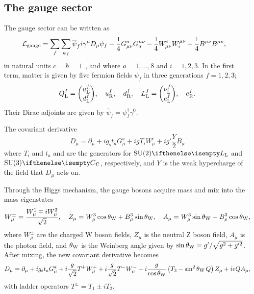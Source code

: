 \subsection{The gauge sector} \label{sec:gauge}
The gauge sector can be written as
\begin{align} \label{eq:gauge}
  \Lg{gauge} &= \sum_f \sum_{\psi_f} \overline{\psi}_f i\gamma^\mu D_\mu \psi_f %
              -\frac{1}{4} G^a_{\mu\nu}G_a^{\mu\nu}
              -\frac{1}{4} W^i_{\mu\nu}W_i^{\mu\nu}
              -\frac{1}{4} B^{\mu\nu}B^{\mu\nu},
\end{align}
in natural units $c=\hbar=1$~\cite{flavor_lecture_Isidori_UZH}, and where $a=1,...,8$ and $i=1,2,3$.
In the first term, matter is given by five fermion fields $\psi_f$ in three generations $f=1,2,3$;
\begin{equation} \label{eq:matter}
  \ff{Q}{L}^f = \db{\ff{u^f}{L}}{\ff{d^f}{L}},\quad
  \ff{u}{R}^f,\quad
  \ff{d}{R}^f,\quad
  \ff{L}{L}^f = \db{\ff{\nu^f}{L}}{\ff{e^f}{L}},\quad
  \ff{e}{R}^f.
\end{equation}
Their Dirac adjoints are given by $\overline{\psi}_f = \psi_f^\dagger\gamma^0$.



The covariant derivative
\begin{equation}
  D_\mu = \partial_\mu
          + ig_\mathrm{s}t_aG^a_\mu
          + igT_iW^i_\mu
          + ig'\frac{Y}{2}B_\mu
\end{equation}
where $T_i$ and $t_a$ and are the generators for $\SU[L]{2}$ and $\SU[C]{3}$, respectively, and $Y$ is the weak hypercharge of the field that $D_\mu$ acts on.

Through the Higgs mechanism, the gauge bosons acquire mass and mix into the mass eigenstates
\begin{equation}
  W^\pm_\mu = \frac{W^1_\mu \mp iW^2_\mu}{\sqrt{2}},\quad
  Z_\mu = W^3_\mu\cos{\ensuremath{\theta_\mathrm{W}}} + B^3_\mu\sin{\ensuremath{\theta_\mathrm{W}}},\quad
  A_\mu = W^3_\mu\sin{\ensuremath{\theta_\mathrm{W}}} - B^3_\mu\cos{\ensuremath{\theta_\mathrm{W}}},
\end{equation}
where $W^\pm_\mu$ are the charged W boson fields,
$Z_\mu$ is the neutral Z boson field,
$A_\mu$ is the photon field,
and ${\theta_\mathrm{W}}$ is the Weinberg angle given by $\sin{\ensuremath{\theta_\mathrm{W}}} = g'/\sqrt{g^2+g'^2}$.
After mixing, the new covariant derivative becomes
\begin{equation} \label{eq:D_mu_broken}
  D_\mu = \partial_\mu
          + ig_\mathrm{s}t_aG^a_\mu
          + i\frac{g}{\sqrt{2}}T^+W^+_\mu
          + i\frac{g}{\sqrt{2}}T^-W^-_\mu
          + i\frac{g}{\cos{\ensuremath{\theta_\mathrm{W}}}}\left( T_3 - \sin^2{{\theta_\mathrm{W}}}\, Q \right)Z_\mu
          + ieQA_\mu,
\end{equation}
with ladder operators $T^\pm = T_1 \pm iT_2$.


